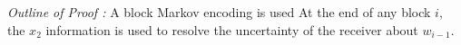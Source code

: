 \documentclass[preview]{standalone}
\begin{document}
\begin{center}
\textit{Outline of Proof :} A block Markov encoding is used At the end of any block $i,$ the $x_2$ information is used to resolve the uncertainty of the receiver about $w_{i-1}.$
\end{center}
\end{document}
